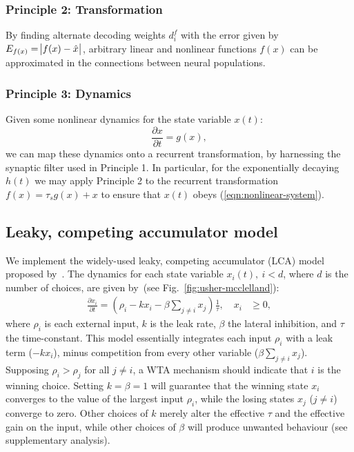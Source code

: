 \documentclass[10pt,letterpaper]{article}
\begin{document}
\subsubsection{Principle 2: Transformation}
By finding alternate decoding weights $d^f_i$ with the error given by $E_{f(x)} = \abs{f(x) - \hat x}$, arbitrary linear and nonlinear functions $f(x)$ can be approximated in the connections between neural populations.

\subsubsection{Principle 3: Dynamics}
Given some nonlinear dynamics for the state variable $x(t)$:
\begin{equation} \label{eqn:nonlinear-system}
    \frac{\partial x}{\partial t} = g(x) ,
\end{equation}
we can map these dynamics onto a recurrent transformation, by harnessing the synaptic filter used in Principle 1.
In particular, for the exponentially decaying $h(t)$ we may apply Principle 2 to the recurrent transformation $f(x) = \tau_s g(x) + x$ to ensure that $x(t)$ obeys (\ref{eqn:nonlinear-system}).

\subsection{Leaky, competing accumulator model}
We implement the widely-used leaky, competing accumulator (LCA) model proposed by~.
The dynamics for each state variable $x_i(t),\ i < d$, where $d$ is the number of choices, are given by~(see Fig.~\ref{fig:usher-mcclelland}):
\begin{equation} \label{eqn:usher-mcclelland}
    \begin{split}
        \frac{{\partial x}_i}{\partial t} = \left(\rho_i - kx_i - \beta \sum_{j \neq i} x_j\right) \frac{1}{\tau}, \quad x_i &\ge 0,
    \end{split}
\end{equation}
where $\rho_i$ is each external input, $k$ is the leak rate, $\beta$ the lateral inhibition, and $\tau$ the time-constant.
This model essentially integrates each input $\rho_i$ with a leak term ($- kx_i$), minus competition from every other variable ($\beta \sum_{j \neq i} x_j$).
Supposing $\rho_i > \rho_j$ for all $j \ne i$, a WTA mechanism should indicate that $i$ is the winning choice.
Setting $k = \beta = 1$ will guarantee that the winning state $x_i$ converges to the value of the largest input $\rho_i$, while the losing states $x_j$ ($j \ne i$) converge to zero.
Other choices of $k$ merely alter the effective $\tau$ and the effective gain on the input, while other choices of $\beta$ will produce unwanted behaviour (see supplementary analysis).
\end{document}
